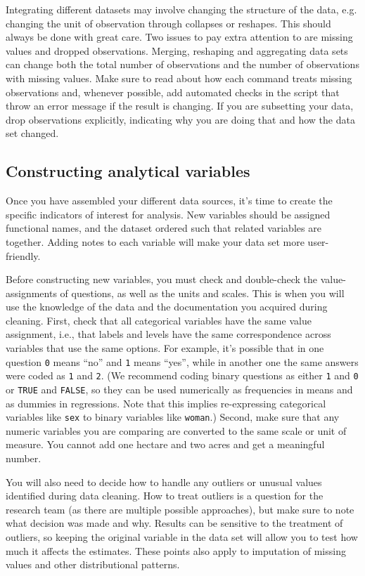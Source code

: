 Integrating different datasets may involve changing the structure of the data,
e.g. changing the unit of observation through collapses or reshapes.
This should always be done with great care. 
Two issues to pay extra attention to are missing values and dropped observations.
Merging, reshaping and aggregating data sets can change both the total number of observations
and the number of observations with missing values.
Make sure to read about how each command treats missing observations and,
whenever possible, add automated checks in the script that throw an error message if the result is changing.
If you are subsetting your data,
drop observations explicitly,
indicating why you are doing that and how the data set changed.

\subsection{Constructing analytical variables}
Once you have assembled your different data sources, 
it's time to create the specific indicators of interest for analysis. 
New variables should be assigned functional names, 
and the dataset ordered such that related variables are together.
Adding notes to each variable will make your data set more user-friendly.

Before constructing new variables,
you must check and double-check the value-assignments of questions,
as well as the units and scales.
This is when you will use the knowledge of the data and the documentation you acquired during cleaning.
First, check that all categorical variables have the same value assignment, i.e.,
that labels and levels have the same correspondence across variables that use the same options.
For example, it's possible that in one question \texttt{0} means ``no'' and \texttt{1} means ``yes'',
while in another one the same answers were coded as \texttt{1} and \texttt{2}.
(We recommend coding binary questions as either \texttt{1} and \texttt{0} or \texttt{TRUE} and \texttt{FALSE},
so they can be used numerically as frequencies in means and as dummies in regressions.
Note that this implies re-expressing categorical variables like \texttt{sex} to binary variables like \texttt{woman}.)
Second, make sure that any numeric variables you are comparing are converted to the same scale or unit of measure.
You cannot add one hectare and two acres and get a meaningful number.

You will also need to decide how to handle any outliers or unusual values identified during data cleaning. 
How to treat outliers is a question for the research team (as there are multiple possible approaches),
but make sure to note what decision was made and why.
Results can be sensitive to the treatment of outliers,
so keeping the original variable in the data set will allow you to test how much it affects the estimates.
These points also apply to imputation of missing values and other distributional patterns.

